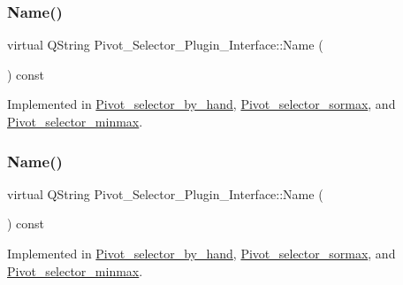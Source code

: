 \subsubsection{\texorpdfstring{Name()}{Name()}\hspace{0.1cm}{\footnotesize\ttfamily [1/4]}}
{\footnotesize\ttfamily virtual Q\+String Pivot\+\_\+\+Selector\+\_\+\+Plugin\+\_\+\+Interface\+::\+Name (\begin{DoxyParamCaption}{ }\end{DoxyParamCaption}) const\hspace{0.3cm}{\ttfamily [pure virtual]}}



Implemented in \hyperlink{classPivot__selector__by__hand_adb03a4ea722819c478e5fd71e5e6f364}{Pivot\+\_\+selector\+\_\+by\+\_\+hand}, \hyperlink{classPivot__selector__sormax_a72875b6810a0f83c77ff2abde1b186a4}{Pivot\+\_\+selector\+\_\+sormax}, and \hyperlink{classPivot__selector__minmax_a9df8c5a5f3a0cf1f9c97ee8d8ad68b1b}{Pivot\+\_\+selector\+\_\+minmax}.

\mbox{\label{classPivot__Selector__Plugin__Interface_a35b4215e27a169edc2260f2e578de184}} 
\subsubsection{\texorpdfstring{Name()}{Name()}\hspace{0.1cm}{\footnotesize\ttfamily [2/4]}}
{\footnotesize\ttfamily virtual Q\+String Pivot\+\_\+\+Selector\+\_\+\+Plugin\+\_\+\+Interface\+::\+Name (\begin{DoxyParamCaption}{ }\end{DoxyParamCaption}) const\hspace{0.3cm}{\ttfamily [pure virtual]}}



Implemented in \hyperlink{classPivot__selector__by__hand_adb03a4ea722819c478e5fd71e5e6f364}{Pivot\+\_\+selector\+\_\+by\+\_\+hand}, \hyperlink{classPivot__selector__sormax_a72875b6810a0f83c77ff2abde1b186a4}{Pivot\+\_\+selector\+\_\+sormax}, and \hyperlink{classPivot__selector__minmax_a9df8c5a5f3a0cf1f9c97ee8d8ad68b1b}{Pivot\+\_\+selector\+\_\+minmax}.

